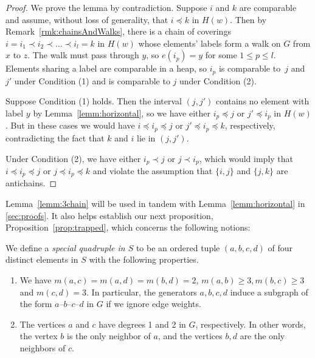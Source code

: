 \documentclass[ALCO,Unicode,published]{cedram}
\begin{document}
\begin{proof}
    We prove the lemma by contradiction.  Suppose $i$ and $k$ are comparable and assume, without
    loss of generality, that $i\preceq k$ in $H(w)$. Then by Remark~\ref{rmk:chainsAndWalks}, there is a
    chain of coverings $i=i_1\prec i_2\prec \dots\prec i_l=k$ in $H(w)$ whose elements' labels form
    a walk on $G$ from $x$ to $z$. The walk must pass through $y$, so $e(i_p)=y$ for some $1\le p\le
    l$. Elements sharing a label are comparable in a heap, so $i_p$ is comparable to~$j$ and $j'$
    under Condition (1) and is comparable to $j$ under Condition (2).

    Suppose Condition (1) holds. Then the interval $(j,j')$ contains no element with label $y$ by
    Lemma~\ref{lemm:horizontal}, so we have either $i_p\preceq j$ or $j'\preceq i_p$ in $H(w)$. But in
    these cases we would have $i\preceq i_p\preceq j$ or $j'\preceq i_p\preceq k$, respectively,
    contradicting the fact that $k$ and $i$ lie in $(j,j')$.
    
    Under Condition (2), we have either $i_p\prec j$ or $j\prec i_p$, which would imply that
    $i\preceq i_p\preceq j$ or $j\preceq i_p\preceq k$ and violate the assumption that $\{i,j\}$ and
    $\{j,k\}$ are antichains.
\end{proof}

Lemma~\ref{lemm:3chain} will be used in tandem with Lemma~\ref{lemm:horizontal} in \autoref{sec:proofs}. It also
helps establish our next proposition, Proposition~\ref{prop:trapped}, which concerns the following notions:

\begin{definition}
    We define a \emph{special quadruple in $S$} to be an ordered tuple $(a,b,c,d)$ of four distinct
    elements in $S$ with the following properties. 
    \begin{enumerate}
        \item We have $m(a,c)=m(a,d)=m(b,d)=2$, $m(a,b)\ge 3, m(b,c)\ge 3$ and $m(c,d)=3$. In
             particular, the generators $a,b,c,d$ induce a subgraph of the form $a$--$b$--$c$--$d$
             in $G$ if we ignore edge weights. 
        \item The vertices $a$ and $c$ have degrees 1 and 2 in $G$, respectively. In other words,
             the vertex $b$ is the only neighbor of $a$, and the vertices $b,d$ are the only
             neighbors of $c$.
    \end{enumerate}
    \label{def:quadruple}
\end{definition}
\end{document}
